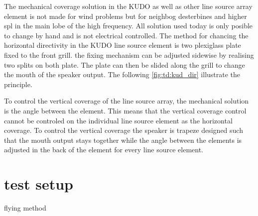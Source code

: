 


The mechanical coverage solution in the KUDO as well as other line source array element is not made for wind problems but for neighbog desterbines and higher \gls{spl} in the main lobe of the high frequency. All solution used today is only posible to change by hand and is not electrical controlled. The method for chancing the horizontal directivity in the KUDO line source element is two plexiglass plate fixed to the front grill. the fixing mechanism can be adjusted sidewise by realising two splits on both plate. The plate can then be slided along the grill to change the mouth of the speaker output. The following \autoref{fig:td:kud_dir} illustrate the principle.


To control the vertical coverage of the line source array, the mechanical solution is the angle between the element. This means that the vertical coverage control cannot be controled on the individual line source element as the horizontal coverage. To control the vertical coverage the speaker is trapeze designed such that the mouth output stays together while the angle between the elements is adjusted in the back of the element for every line source element.


\section{test setup}


flying method 


